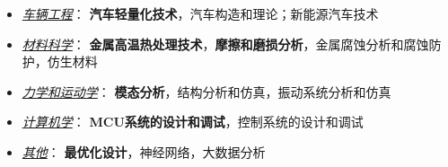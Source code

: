 \documentclass[zh]{resume}
\newcommand{\Matlab}{\textsc{Matlab}\textsuperscript{\textregistered} }
\newcommand{\Ansys}{\textsc{Ansys}\textsuperscript{\textregistered} }
\newcommand{\Mathematica}{\textsc{Mathematica}\textsuperscript{\textregistered} }
\newcommand{\Microsoft}{\textsc{Microsoft}\textsuperscript{\textregistered} }
\begin{document}
\begin{itemize}
  \item \textit{\underline{车辆工程}}： \textbf{汽车轻量化技术}，汽车构造和理论；新能源汽车技术
  \item \textit{\underline{材料科学}}： \textbf{金属高温热处理技术}，\textbf{摩擦和磨损分析}，金属腐蚀分析和腐蚀防护，仿生材料
  \item \textit{\underline{力学和运动学}}： \textbf{模态分析}，结构分析和仿真，振动系统分析和仿真
  \item \textit{\underline{计算机学}}： \textbf{MCU系统的设计和调试}，控制系统的设计和调试
  \item \textit{\underline{其他}}： \textbf{最优化设计}，神经网络，大数据分析
\end{itemize}

% 
%  
%  
%  
\end{document}
